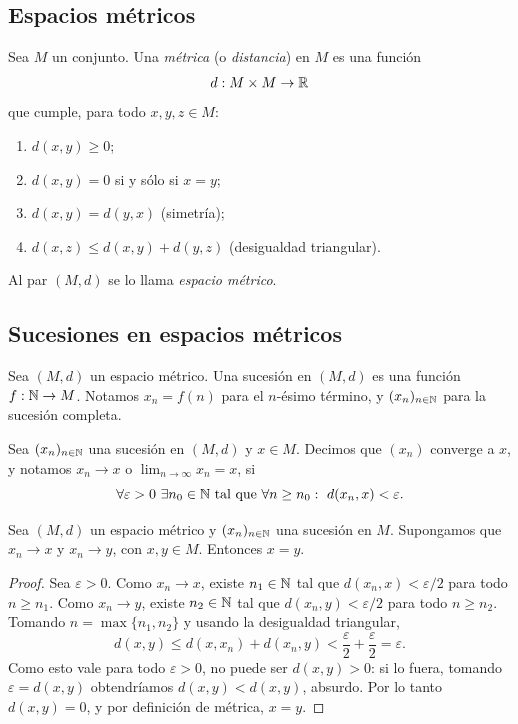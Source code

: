\subsection{Espacios métricos}

\begin{defi}[Métrica]
Sea $M$ un conjunto. Una \emph{métrica} (o \emph{distancia}) en $M$ es una función
\[
d : M \times M \to \mathbb{R}
\]
que cumple, para todo $x,y,z \in M$:
\begin{enumerate}[label=(\roman*)]
\item $d(x,y) \ge 0$;
\item $d(x,y) = 0$ si y sólo si $x=y$;
\item $d(x,y) = d(y,x)$ (simetría);
\item $d(x,z) \le d(x,y) + d(y,z)$ (desigualdad triangular).
\end{enumerate}
Al par $(M,d)$ se lo llama \emph{espacio métrico}.
\end{defi}

\subsection{Sucesiones en espacios métricos}

\begin{defi}
Sea $(M,d)$ un espacio métrico. Una sucesión en $(M,d)$ es una función
$f : \mathbb{N} \to M$. Notamos $x_n = f(n)$ para el $n$-ésimo término, y
$(x_n)_{n\in\mathbb{N}}$ para la sucesión completa.
\end{defi}

\begin{defi}[Convergencia]
Sea $(x_n)_{n\in\mathbb{N}}$ una sucesión en $(M,d)$ y $x \in M$. Decimos que $(x_n)$
converge a $x$, y notamos $x_n \to x$ o $\lim_{n\to\infty} x_n = x$, si
\[
\forall \varepsilon > 0 \ \exists n_0 \in \mathbb{N} \ \text{tal que} \ \forall n \ge n_0:
\ d(x_n,x) < \varepsilon.
\]
\end{defi}

\begin{prop}
Sea $(M,d)$ un espacio métrico y $(x_n)_{n\in\mathbb{N}}$ una sucesión en $M$.
Supongamos que $x_n \to x$ y $x_n \to y$, con $x,y \in M$. Entonces $x=y$.
\end{prop}

\begin{proof}
Sea $\varepsilon > 0$. Como $x_n \to x$, existe $n_1 \in \mathbb{N}$ tal que
$d(x_n,x) < \varepsilon/2$ para todo $n \ge n_1$. Como $x_n \to y$, existe
$n_2 \in \mathbb{N}$ tal que $d(x_n,y) < \varepsilon/2$ para todo $n \ge n_2$. Tomando
$n = \max\{n_1,n_2\}$ y usando la desigualdad triangular,
\[
d(x,y) \le d(x,x_n) + d(x_n,y) < \frac{\varepsilon}{2} + \frac{\varepsilon}{2} = \varepsilon.
\]
Como esto vale para todo $\varepsilon>0$, no puede ser $d(x,y)>0$: si lo
fuera, tomando $\varepsilon = d(x,y)$ obtendríamos $d(x,y) < d(x,y)$, absurdo.
Por lo tanto $d(x,y)=0$, y por definición de métrica, $x=y$.
\end{proof}

